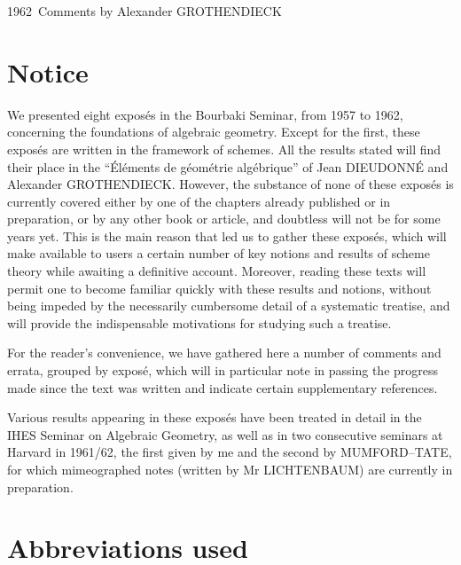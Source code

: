 \unit{1962 Comments}
%
  {by Alexander GROTHENDIECK}

\section*{Notice}

We presented eight exposés in the Bourbaki Seminar, from 1957 to 1962,
concerning the foundations of algebraic geometry. Except for the first, these
exposés are written in the framework of schemes. All the results stated will
find their place in the “Éléments de géométrie algébrique” of Jean DIEUDONNÉ
and Alexander GROTHENDIECK. However, the substance of none of these exposés is
currently covered either by one of the chapters already published or in
preparation, or by any other book or article, and doubtless will not be for
some years yet. This is the main reason that led us to gather these exposés,
which will make available to users a certain number of key notions and results
of scheme theory while awaiting a definitive account. Moreover, reading these
texts will permit one to become familiar quickly with these results and
notions, without being impeded by the necessarily cumbersome detail of a
systematic treatise, and will provide the indispensable motivations for
studying such a treatise.

For the reader's convenience, we have gathered here a number of comments and
errata, grouped by exposé, which will in particular note in passing the
progress made since the text was written and indicate certain supplementary
references.

Various results appearing in these exposés have been treated in detail in the
IHES Seminar on Algebraic Geometry, as well as in two consecutive seminars at
Harvard in 1961/62, the first given by me and the second by MUMFORD--TATE, for
which mimeographed notes (written by Mr LICHTENBAUM) are currently in
preparation.

\section*{Abbreviations used}

